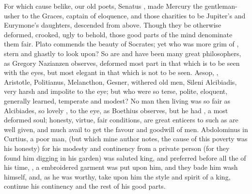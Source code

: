 {For which cause belike, our old poets, Senatus ,
made Mercury the gentleman-usher to the Graces, captain of eloquence,
and those charities to be Jupiter's and Eurymone's daughters, descended
from above. Though they be otherwise deformed, crooked, ugly to behold,
those good parts of the mind denominate them fair. Plato commends the
beauty of Socrates; yet who was more grim of , stern and
ghastly to look upon? So are and have been many great philosophers, as
Gregory Nazianzen observes, deformed most part in that which is
to be seen with the eyes, but most elegant in that which is not to be
seen.  Aesop, \Democritus{},
Aristotle, Politianus, Melancthon, Gesner, \etc{} withered old men, Sileni
Alcibiadis, very harsh and impolite to the eye; but who were so terse,
polite, eloquent, generally learned, temperate and modest? No man then
living was so fair as Alcibiades, so lovely , to the
eye, as Boethius observes, but he had ,
a most deformed soul; honesty, virtue, fair conditions, are great
enticers to such as are well given, and much avail to get the favour
and goodwill of men. Abdolominus in Curtius, a poor man, (but which
mine author notes, the cause of this poverty was his honesty) for
his modesty and continency from a private person (for they found him
digging in his garden) was saluted king, and preferred before all the
 of his time, , a
 embroidered garment was put upon him, and they bade him
wash himself, and, as he was worthy, take upon him the style and spirit
of a king, continue his continency and the rest of his good parts.

}
